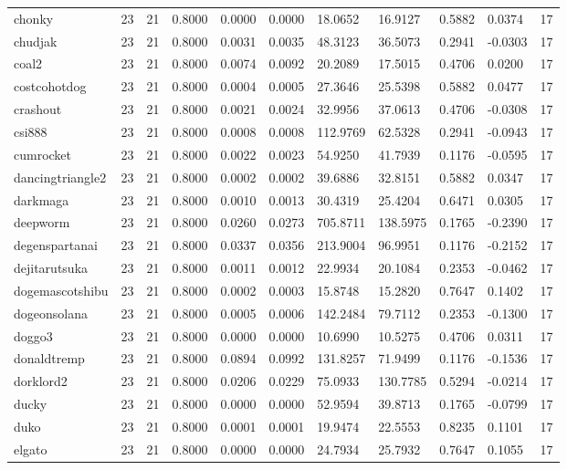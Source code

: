\begin{table}[htbp]
\begin{tabular}{lllllllllll}
chonky & 23 & 21 & 0.8000 & 0.0000 & 0.0000 & 18.0652 & 16.9127 & 0.5882 & 0.0374 & 17 \\
chudjak & 23 & 21 & 0.8000 & 0.0031 & 0.0035 & 48.3123 & 36.5073 & 0.2941 & -0.0303 & 17 \\
coal2 & 23 & 21 & 0.8000 & 0.0074 & 0.0092 & 20.2089 & 17.5015 & 0.4706 & 0.0200 & 17 \\
costcohotdog & 23 & 21 & 0.8000 & 0.0004 & 0.0005 & 27.3646 & 25.5398 & 0.5882 & 0.0477 & 17 \\
crashout & 23 & 21 & 0.8000 & 0.0021 & 0.0024 & 32.9956 & 37.0613 & 0.4706 & -0.0308 & 17 \\
csi888 & 23 & 21 & 0.8000 & 0.0008 & 0.0008 & 112.9769 & 62.5328 & 0.2941 & -0.0943 & 17 \\
cumrocket & 23 & 21 & 0.8000 & 0.0022 & 0.0023 & 54.9250 & 41.7939 & 0.1176 & -0.0595 & 17 \\
dancingtriangle2 & 23 & 21 & 0.8000 & 0.0002 & 0.0002 & 39.6886 & 32.8151 & 0.5882 & 0.0347 & 17 \\
darkmaga & 23 & 21 & 0.8000 & 0.0010 & 0.0013 & 30.4319 & 25.4204 & 0.6471 & 0.0305 & 17 \\
deepworm & 23 & 21 & 0.8000 & 0.0260 & 0.0273 & 705.8711 & 138.5975 & 0.1765 & -0.2390 & 17 \\
degenspartanai & 23 & 21 & 0.8000 & 0.0337 & 0.0356 & 213.9004 & 96.9951 & 0.1176 & -0.2152 & 17 \\
dejitarutsuka & 23 & 21 & 0.8000 & 0.0011 & 0.0012 & 22.9934 & 20.1084 & 0.2353 & -0.0462 & 17 \\
dogemascotshibu & 23 & 21 & 0.8000 & 0.0002 & 0.0003 & 15.8748 & 15.2820 & 0.7647 & 0.1402 & 17 \\
dogeonsolana & 23 & 21 & 0.8000 & 0.0005 & 0.0006 & 142.2484 & 79.7112 & 0.2353 & -0.1300 & 17 \\
doggo3 & 23 & 21 & 0.8000 & 0.0000 & 0.0000 & 10.6990 & 10.5275 & 0.4706 & 0.0311 & 17 \\
donaldtremp & 23 & 21 & 0.8000 & 0.0894 & 0.0992 & 131.8257 & 71.9499 & 0.1176 & -0.1536 & 17 \\
dorklord2 & 23 & 21 & 0.8000 & 0.0206 & 0.0229 & 75.0933 & 130.7785 & 0.5294 & -0.0214 & 17 \\
ducky & 23 & 21 & 0.8000 & 0.0000 & 0.0000 & 52.9594 & 39.8713 & 0.1765 & -0.0799 & 17 \\
duko & 23 & 21 & 0.8000 & 0.0001 & 0.0001 & 19.9474 & 22.5553 & 0.8235 & 0.1101 & 17 \\
elgato & 23 & 21 & 0.8000 & 0.0000 & 0.0000 & 24.7934 & 25.7932 & 0.7647 & 0.1055 & 17 \\

\end{tabular}
\end{table}
